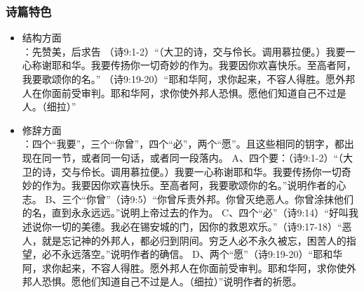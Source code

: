 \subsubsection{诗篇特色}
\begin{itemize}
\item 结构方面 \\
：先赞美，后求告
（诗9:1-2）“（大卫的诗，交与伶长。调用慕拉便。）我要一心称谢耶和华。我要传扬你一切奇妙的作为。我要因你欢喜快乐。至高者阿，我要歌颂你的名。”
（诗9:19-20）“耶和华阿，求你起来，不容人得胜。愿外邦人在你面前受审判。耶和华阿，求你使外邦人恐惧。愿他们知道自己不过是人。（细拉）”

\item 修辞方面\\
：四个“我要”，三个“你曾”，四个“必”，两个“愿”。且这些相同的钥字，都出现在同一节，或者同一句话，或者同一段落内。
A、四个要：（诗9:1-2）“（大卫的诗，交与伶长。调用慕拉便。）我要一心称谢耶和华。我要传扬你一切奇妙的作为。我要因你欢喜快乐。至高者阿，我要歌颂你的名。”说明作者的心志。
B、三个“你曾”（诗9:5）“你曾斥责外邦。你曾灭绝恶人。你曾涂抹他们的名，直到永永远远。”说明上帝过去的作为。
C、四个“必”（诗9:14）“好叫我述说你一切的美德。我必在锡安城的门，因你的救恩欢乐。”（诗9:17-18）“恶人，就是忘记神的外邦人，都必归到阴间。穷乏人必不永久被忘，困苦人的指望，必不永远落空。”说明作者的确信。
D、两个“愿”（诗9:19-20）“耶和华阿，求你起来，不容人得胜。愿外邦人在你面前受审判。耶和华阿，求你使外邦人恐惧。愿他们知道自己不过是人。（细拉）”说明作者的祈愿。
\end{itemize}

